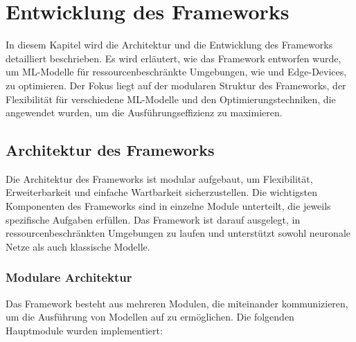 \chapter{Entwicklung des Frameworks}
\label{chap:entwicklung_framework}

In diesem Kapitel wird die Architektur und die Entwicklung des Frameworks detailliert beschrieben. Es wird erläutert, wie das Framework entworfen wurde, 
um ML-Modelle für ressourcenbeschränkte Umgebungen, wie \Emb und Edge-Devices, zu optimieren. Der Fokus liegt auf der modularen Struktur des Frameworks, 
der Flexibilität für verschiedene ML-Modelle und den Optimierungstechniken, die angewendet wurden, um die Ausführungseffizienz zu maximieren.

\section{Architektur des Frameworks}
Die Architektur des Frameworks ist modular aufgebaut, um Flexibilität, Erweiterbarkeit und einfache Wartbarkeit sicherzustellen. Die wichtigsten Komponenten 
des Frameworks sind in einzelne Module unterteilt, die jeweils spezifische Aufgaben erfüllen. Das Framework ist darauf ausgelegt, in ressourcenbeschränkten 
Umgebungen zu laufen und unterstützt sowohl neuronale Netze als auch klassische \ML Modelle.

\subsection{Modulare Architektur}
Das Framework besteht aus mehreren Modulen, die miteinander kommunizieren, um die Ausführung von \ML Modellen auf \Emb zu ermöglichen. 
Die folgenden Hauptmodule wurden implementiert:

